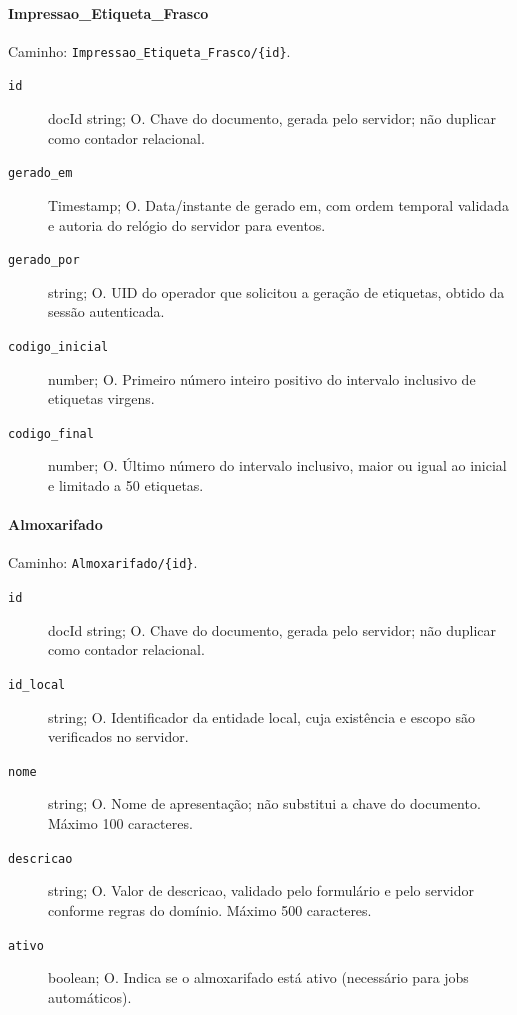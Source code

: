 \paragraph{Impressao\_Etiqueta\_Frasco}\mbox{}\par
Caminho: \texttt{Impressao\_Etiqueta\_Frasco/\{id\}}.
\begin{description}
\item[\texttt{id}] docId string; O. Chave do documento, gerada pelo servidor; não duplicar como contador relacional.
\item[\texttt{gerado\_em}] Timestamp; O. Data/instante de gerado em, com ordem temporal validada e autoria do relógio do servidor para eventos.
\item[\texttt{gerado\_por}] string; O. UID do operador que solicitou a geração de etiquetas, obtido da sessão autenticada.
\item[\texttt{codigo\_inicial}] number; O. Primeiro número inteiro positivo do intervalo inclusivo de etiquetas virgens.
\item[\texttt{codigo\_final}] number; O. Último número do intervalo inclusivo, maior ou igual ao inicial e limitado a 50 etiquetas.
\end{description}

\paragraph{Almoxarifado}\mbox{}\par
Caminho: \texttt{Almoxarifado/\{id\}}.
\begin{description}
\item[\texttt{id}] docId string; O. Chave do documento, gerada pelo servidor; não duplicar como contador relacional.
\item[\texttt{id\_local}] string; O. Identificador da entidade local, cuja existência e escopo são verificados no servidor.
\item[\texttt{nome}] string; O. Nome de apresentação; não substitui a chave do documento. Máximo 100 caracteres.
\item[\texttt{descricao}] string; O. Valor de descricao, validado pelo formulário e pelo servidor conforme regras do domínio. Máximo 500 caracteres.
\item[\texttt{ativo}] boolean; O. Indica se o almoxarifado está ativo (necessário para jobs automáticos).
\end{description}

